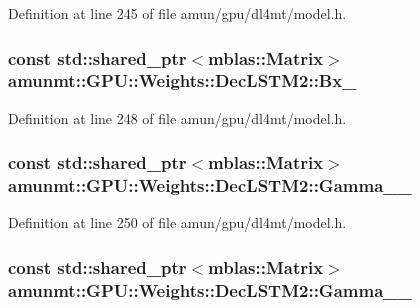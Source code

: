 Definition at line 245 of file amun/gpu/dl4mt/model.\+h.

\subsubsection[{\texorpdfstring{Bx\+\_\+}{Bx_}}]{\setlength{\rightskip}{0pt plus 5cm}const std\+::shared\+\_\+ptr$<${\bf mblas\+::\+Matrix}$>$ amunmt\+::\+G\+P\+U\+::\+Weights\+::\+Dec\+L\+S\+T\+M2\+::\+Bx\+\_\+}\hypertarget{structamunmt_1_1GPU_1_1Weights_1_1DecLSTM2_a7a70cd1fe9bdce85fbbeee1d88b9abe7}{}\label{structamunmt_1_1GPU_1_1Weights_1_1DecLSTM2_a7a70cd1fe9bdce85fbbeee1d88b9abe7}


Definition at line 248 of file amun/gpu/dl4mt/model.\+h.

\subsubsection[{\texorpdfstring{Gamma\+\_\+1\+\_\+}{Gamma_1_}}]{\setlength{\rightskip}{0pt plus 5cm}const std\+::shared\+\_\+ptr$<${\bf mblas\+::\+Matrix}$>$ amunmt\+::\+G\+P\+U\+::\+Weights\+::\+Dec\+L\+S\+T\+M2\+::\+Gamma\+\_\+\_\+}\hypertarget{structamunmt_1_1GPU_1_1Weights_1_1DecLSTM2_aae5a30acdf8ac081e637d8f619eff095}{}\label{structamunmt_1_1GPU_1_1Weights_1_1DecLSTM2_aae5a30acdf8ac081e637d8f619eff095}


Definition at line 250 of file amun/gpu/dl4mt/model.\+h.

\subsubsection[{\texorpdfstring{Gamma\+\_\+2\+\_\+}{Gamma_2_}}]{\setlength{\rightskip}{0pt plus 5cm}const std\+::shared\+\_\+ptr$<${\bf mblas\+::\+Matrix}$>$ amunmt\+::\+G\+P\+U\+::\+Weights\+::\+Dec\+L\+S\+T\+M2\+::\+Gamma\+\_\+\_\+}\hypertarget{structamunmt_1_1GPU_1_1Weights_1_1DecLSTM2_a3f15c6e48f5c63685d3645bba5b755cb}{}\label{structamunmt_1_1GPU_1_1Weights_1_1DecLSTM2_a3f15c6e48f5c63685d3645bba5b755cb}


